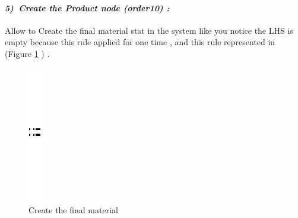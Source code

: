 \paragraph{\emph{5)~Create the Product node (order10) :} }
 
 
Allow to Create the final material stat in the system like you notice the LHS is empty because this rule applied for one time , and this rule represented in 
(Figure \ref{fig:Create the final material} ) .


\vspace{1cm}
\begin{figure}[th]
\centering


\quad{}
\includegraphics{Chapiter3/img/sep}
\quad{}


\caption{\label{fig:Create the final material}Create the final material}
 
\end{figure}
\vspace{1cm}

